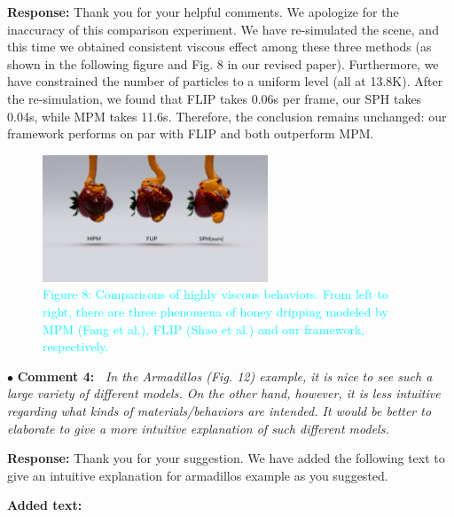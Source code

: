 \documentclass[12pt,a4paper]{article}
\newcommand{\revised}[1]{\textcolor{cyan}{#1}}
\begin{document}
\vspace{0.2cm}
\textbf{Response:}
Thank you for your helpful comments. We apologize for the inaccuracy of this comparison experiment. We have re-simulated the scene, and this time we obtained consistent viscous effect among these three methods (as shown in the following figure and Fig. 8 in our revised paper). Furthermore, we have constrained the number of particles to a uniform level (all at 13.8K). After the re-simulation, we found that FLIP takes 0.06s per frame, our SPH takes 0.04s, while MPM takes 11.6s. Therefore, the conclusion remains unchanged: our framework performs on par with FLIP and both outperform MPM.


\begin{figure}[htbp]
	\centering
	\includegraphics[width=0.6\textwidth]{pics/honey_comp.png}
	\captionsetup{labelformat=empty}
	\caption{\revised{Figure 8: Comparisons of highly viscous behaviors. From left to right, there are three phenomena of honey dripping modeled by MPM (Fang et al.), FLIP (Shao et al.) and our framework, respectively.}}
\end{figure}



\vspace{0.4cm}
\noindent$\bullet$ \enspace \textbf{Comment 4:~\label{Armadillos}}
\textit{In the Armadillos (Fig. 12) example, it is nice to see such a large variety of different models. On the other hand, however, it is less intuitive regarding what kinds of materials/behaviors are intended. It would be better to elaborate to give a more intuitive explanation of such different models.  }

\vspace{0.2cm}
\textbf{Response:}
Thank you for your suggestion. We have added the following text to give an intuitive explanation for armadillos example as you suggested.

\vspace{0.2cm}
\textbf{Added text:}
\end{document}
